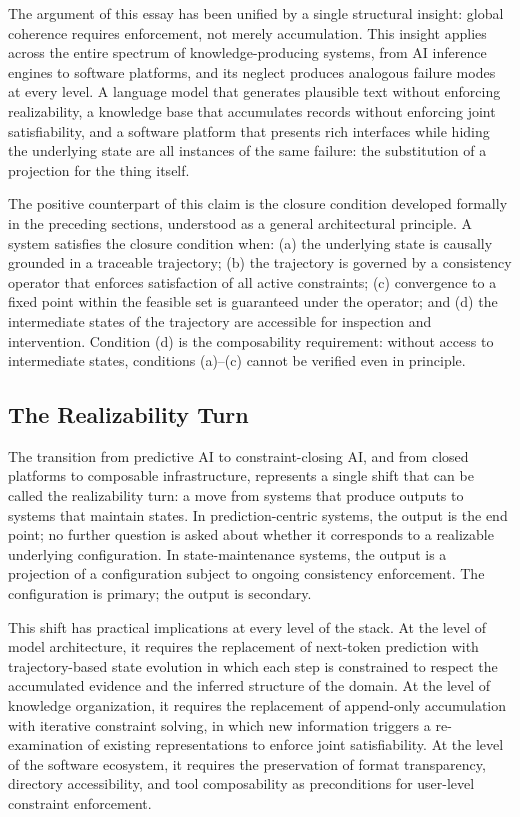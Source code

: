 \documentclass[12pt, oneside]{article}
\begin{document}
The argument of this essay has been unified by a single structural insight: global coherence requires enforcement, not merely accumulation. This insight applies across the entire spectrum of knowledge-producing systems, from AI inference engines to software platforms, and its neglect produces analogous failure modes at every level. A language model that generates plausible text without enforcing realizability, a knowledge base that accumulates records without enforcing joint satisfiability, and a software platform that presents rich interfaces while hiding the underlying state are all instances of the same failure: the substitution of a projection for the thing itself.

The positive counterpart of this claim is the closure condition developed formally in the preceding sections, understood as a general architectural principle. A system satisfies the closure condition when: (a) the underlying state is causally grounded in a traceable trajectory; (b) the trajectory is governed by a consistency operator that enforces satisfaction of all active constraints; (c) convergence to a fixed point within the feasible set is guaranteed under the operator; and (d) the intermediate states of the trajectory are accessible for inspection and intervention. Condition (d) is the composability requirement: without access to intermediate states, conditions (a)--(c) cannot be verified even in principle.

\subsection{The Realizability Turn}

The transition from predictive AI to constraint-closing AI, and from closed platforms to composable infrastructure, represents a single shift that can be called the realizability turn: a move from systems that produce outputs to systems that maintain states. In prediction-centric systems, the output is the end point; no further question is asked about whether it corresponds to a realizable underlying configuration. In state-maintenance systems, the output is a projection of a configuration subject to ongoing consistency enforcement. The configuration is primary; the output is secondary.

This shift has practical implications at every level of the stack. At the level of model architecture, it requires the replacement of next-token prediction with trajectory-based state evolution in which each step is constrained to respect the accumulated evidence and the inferred structure of the domain. At the level of knowledge organization, it requires the replacement of append-only accumulation with iterative constraint solving, in which new information triggers a re-examination of existing representations to enforce joint satisfiability. At the level of the software ecosystem, it requires the preservation of format transparency, directory accessibility, and tool composability as preconditions for user-level constraint enforcement.
\end{document}
